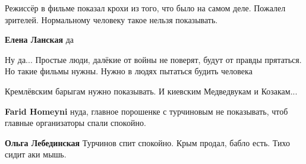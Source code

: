 \begin{itemize}
 

Режиссёр в фильме показал крохи из того, что было на самом деле. Пожалел
зрителей. Нормальному человеку такое нельзя показывать.

\begin{itemize}
 
\textbf{Елена Ланская} да
\end{itemize}


Ну да... Простые люди, далёкие от войны не поверят, будут от правды прятаться.
Но такие фильмы нужны. Нужно в людях пытаться будить человека

 
Кремлёвским барыгам нужно показывать. И киевским Медведвукам и Козакам...

\begin{itemize}
 
\textbf{Farid Homeyni} нуда, главное порошенке с турчиновым не показывать, чтоб главные организаторы спали спокойно.

 
\textbf{Ольга Лебединская} Турчинов спит спокойно. Крым продал, бабло есть. Тихо сидит аки мышь.


\end{itemize}
\end{itemize}
